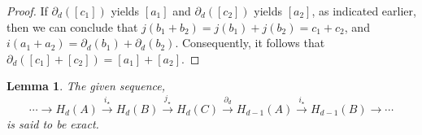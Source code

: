 \documentclass{amsart}
\newtheorem{lemma}[definition]{Lemma}
\begin{document}
\begin{proof}
If $\partial_d([c_1])$ yields $[a_1]$ and $\partial_d([c_2])$ yields $[a_2]$, as indicated earlier, then we can conclude that $j(b_1 + b_2) = j(b_1) + j(b_2) = c_1 + c_2$, and $i(a_1 + a_2) = \partial_d(b_1) + \partial_d(b_2)$. Consequently, it follows that $\partial_d([c_1] + [c_2]) = [a_1] + [a_2]$.
\end{proof}

\begin{lemma}
\label{exacthomsequence}
The given sequence,
\begin{equation*}
\cdots \rightarrow H_d(A) \xrightarrow{i_\star} H_d(B) \xrightarrow{j_\star} H_d(C) \xrightarrow{\partial_d} H_{d-1}(A) \xrightarrow{i_\star} H_{d-1}(B) \rightarrow \cdots
\end{equation*}
is said to be exact.
\end{lemma}
\end{document}

